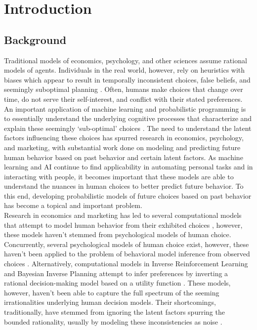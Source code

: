 \chapter{Introduction} \label{intro}
 \section{Background}
 Traditional models of economics, psychology, and other sciences assume rational models of agents. Individuals in the real world, however, rely on heuristics with biases which appear to result in temporally inconsistent choices, false beliefs, and seemingly suboptimal planning \citep{Kahneman1979}. Often, humans make choices that change over time, do not serve their self-interest, and conflict with their stated preferences. \\

 An important application of machine learning and probabilistic programming is to essentially understand the underlying cognitive processes that characterize and explain these seemingly `sub-optimal' choices \citep{Evans2015}. The need to understand the latent factors influencing these choices has spurred research in economics, psychology, and marketing, with substantial work done on modeling and predicting future human behavior based on past behavior and certain latent factors. As machine learning and AI continue to find applicability in automating personal tasks and in interacting with people, it becomes important that these models are able to understand the nuances in human choices to better predict future behavior. To this end, developing probabilistic models of future choices based on past behavior has become a topical and important problem.\\

 Research in economics and marketing has led to several computational models that attempt to model human behavior from their exhibited choices \citep{Szenberg2009}, however, these models haven't stemmed from psychological models of human choice. Concurrently, several psychological models of human choice exist, however, these haven't been applied to the problem of behavioral model inference from observed choices \citep{Busemeyer2005, Train2003, shenoy2013rational}. Alternatively, computational models in Inverse Reinforcement Learning \citep{ng2000algorithms} and Bayesian Inverse Planning \citep{baker2009action} attempt to infer preferences by inverting a rational decision-making model based on a utility function \citep{russell1995modern}. These models, however, haven't been able to capture the full spectrum of the seeming irrationalities underlying human decision models. Their shortcomings, traditionally, have stemmed from ignoring the latent factors spurring the bounded rationality, usually by modeling these inconsistencies as noise \citep{Kim2014, Zheng2014}.\\ 

